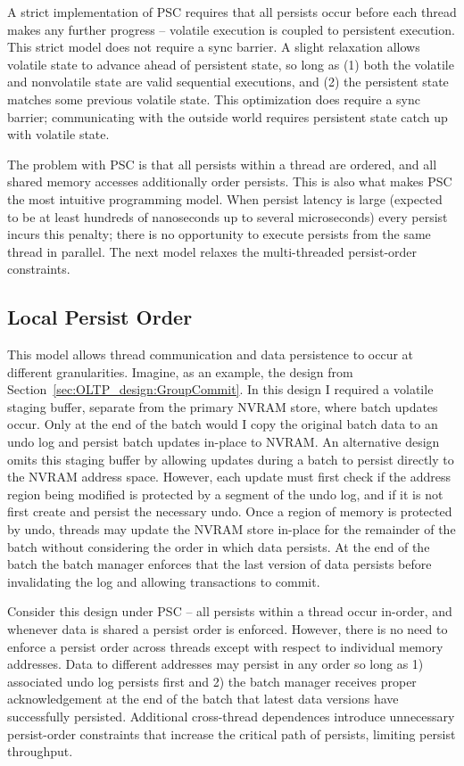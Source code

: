 A strict implementation of PSC requires that all persists occur before each thread makes any further progress -- volatile execution is coupled to persistent execution.
This strict model does not require a sync barrier.
A slight relaxation allows volatile state to advance ahead of persistent state, so long as (1) both the volatile and nonvolatile state are valid sequential executions, and (2) the persistent state matches some previous volatile state.
This optimization does require a sync barrier; communicating with the outside world requires persistent state catch up with volatile state.

The problem with PSC is that all persists within a thread are ordered, and all shared memory accesses additionally order persists.
This is also what makes PSC the most intuitive programming model.
When persist latency is large (expected to be at least hundreds of nanoseconds up to several microseconds) every persist incurs this penalty; there is no opportunity to execute persists from the same thread in parallel.
The next model relaxes the multi-threaded persist-order constraints.

\subsection{Local Persist Order}
\label{sec:PMC:PersistenceModels:LPO}

This model allows thread communication and data persistence to occur at different granularities.
Imagine, as an example, the \GroupCommit design from Section~\ref{sec:OLTP_design:GroupCommit}.
In this design I required a volatile staging buffer, separate from the primary NVRAM store, where batch updates occur.
Only at the end of the batch would I copy the original batch data to an undo log and persist batch updates in-place to NVRAM.
An alternative design omits this staging buffer by allowing updates during a batch to persist directly to the NVRAM address space.
However, each update must first check if the address region being modified is protected by a segment of the undo log, and if it is not first create and persist the necessary undo.
Once a region of memory is protected by undo, threads may update the NVRAM store in-place for the remainder of the batch without considering the order in which data persists.
At the end of the batch the batch manager enforces that the last version of data persists before invalidating the log and allowing transactions to commit.

Consider this design under PSC -- all persists within a thread occur in-order, and whenever data is shared a persist order is enforced.
However, there is no need to enforce a persist order across threads except with respect to individual memory addresses.
Data to different addresses may persist in any order so long as 1) associated undo log persists first and 2) the batch manager receives proper acknowledgement at the end of the batch that latest data versions have successfully persisted.
Additional cross-thread dependences introduce unnecessary persist-order constraints that increase the critical path of persists, limiting persist throughput.

